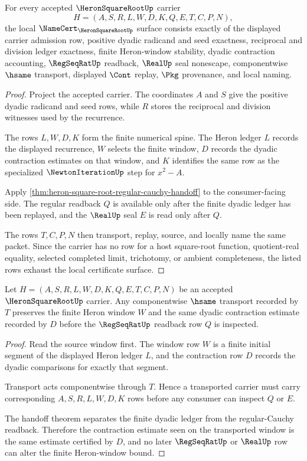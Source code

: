\begin{theorem}
\label{thm:heron-square-root-namecert-obligations}
For every accepted $\HeronSquareRootUp$ carrier
$$
H=(A,S,R,L,W,D,K,Q,E,T,C,P,N),
$$
the local $\NameCert_{\HeronSquareRootUp}$ surface consists exactly of the displayed carrier admission row, positive dyadic radicand and seed exactness, reciprocal and division ledger exactness, finite Heron-window stability, dyadic contraction accounting, $\RegSeqRatUp$ readback, $\RealUp$ seal nonescape, componentwise $\hsame$ transport, displayed $\Cont$ replay, $\Pkg$ provenance, and local naming.
\end{theorem}
\begin{proof}
Project the accepted carrier. The coordinates $A$ and $S$ give the positive dyadic radicand and seed rows, while $R$ stores the reciprocal and division witnesses used by the recurrence.

The rows $L,W,D,K$ form the finite numerical spine. The Heron ledger $L$ records the displayed recurrence, $W$ selects the finite window, $D$ records the dyadic contraction estimates on that window, and $K$ identifies the same row as the specialized $\NewtonIterationUp$ step for $x^2-A$.

Apply \autoref{thm:heron-square-root-regular-cauchy-handoff} to the consumer-facing side. The regular readback $Q$ is available only after the finite dyadic ledger has been replayed, and the $\RealUp$ seal $E$ is read only after $Q$.

The rows $T,C,P,N$ then transport, replay, source, and locally name the same packet. Since the carrier has no row for a host square-root function, quotient-real equality, selected completed limit, trichotomy, or ambient completeness, the listed rows exhaust the local certificate surface.
\end{proof}

\begin{theorem}
\label{thm:heron-square-root-contraction-window-stability}
Let $H=(A,S,R,L,W,D,K,Q,E,T,C,P,N)$ be an accepted $\HeronSquareRootUp$ carrier. Any componentwise $\hsame$ transport recorded by $T$ preserves the finite Heron window $W$ and the same dyadic contraction estimate recorded by $D$ before the $\RegSeqRatUp$ readback row $Q$ is inspected.
\end{theorem}
\begin{proof}
Read the source window first. The window row $W$ is a finite initial segment of the displayed Heron ledger $L$, and the contraction row $D$ records the dyadic comparisons for exactly that segment.

Transport acts componentwise through $T$. Hence a transported carrier must carry corresponding $A,S,R,L,W,D,K$ rows before any consumer can inspect $Q$ or $E$.

The handoff theorem separates the finite dyadic ledger from the regular-Cauchy readback. Therefore the contraction estimate seen on the transported window is the same estimate certified by $D$, and no later $\RegSeqRatUp$ or $\RealUp$ row can alter the finite Heron-window bound.
\end{proof}

